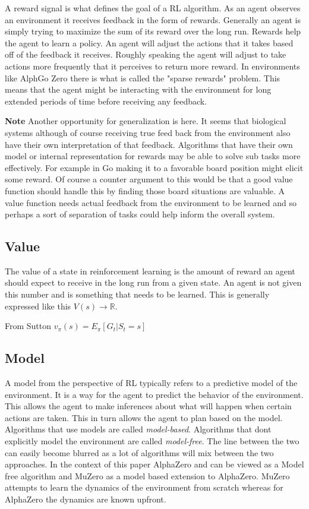     A reward signal is what defines the goal of a RL algorithm. As an agent observes an environment it receives feedback in the form of rewards. Generally an agent is simply trying to maximize the sum of its reward over the long run. Rewards help the agent to learn a policy. An agent will adjust the actions that it takes based off of the feedback it receives. Roughly speaking the agent will adjust to take actions more frequently that it perceives to return more reward. In environments like AlphGo Zero there is what is called the "sparse rewards" problem. This means that the agent might be interacting with the environment for long extended periods of time before receiving any feedback. 
    
    \textbf{Note} Another opportunity for generalization is here. It seems that biological systems although of course receiving true feed back from the environment also have their own interpretation of that feedback. Algorithms that have their own model or internal representation for rewards may be able to solve sub tasks more effectively. For example in Go making it to a favorable board position might elicit some reward. Of course a counter argument to this would be that a good value function should handle this by finding those board situations are valuable. A value function needs actual feedback from the environment to be learned and so perhaps a sort of separation of tasks could help inform the overall system. 
    
    \subsection{Value}
    
    The value of a state in reinforcement learning is the amount of reward an agent should expect to receive in the long run from a given state. An agent is not given this number and is something that needs to be learned. This is generally expressed like this $ V(s) \rightarrow \mathbb{R} $. 
    
    From Sutton
    $ v_{\pi}(s) = E_{\pi}[G_{t}| S_{t} = s]$
    
    
    \subsection{Model}
    
    A model from the perspective of RL typically refers to a predictive model of the environment. It is a way for the agent to predict the behavior of the environment. This allows the agent to make inferences about what will happen when certain actions are taken. This in turn allows the agent to plan based on the model. Algorithms that use models are called \textit{model-based}. Algorithms that dont explicitly model the environment are called \textit{model-free}. The line between the two can easily become blurred as a lot of algorithms will mix between the two approaches. In the context of this paper AlphaZero and can be viewed as a Model free algorithm and MuZero as a model based extension to AlphaZero. MuZero attempts to learn the dynamics of the environment from scratch whereas for AlphaZero the dynamics are known upfront.  
    
